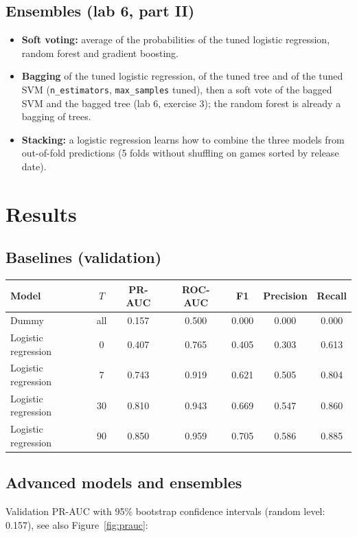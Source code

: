 \documentclass[11pt,a4paper]{article}
\newcommand{\code}[1]{\texttt{#1}}
\begin{document}
\subsection{Ensembles (lab 6, part II)}
\begin{itemize}
  \item \textbf{Soft voting:} average of the probabilities of the tuned logistic regression, random
        forest and gradient boosting.
  \item \textbf{Bagging} of the tuned logistic regression, of the tuned tree and of the tuned SVM
        (\code{n\_estimators}, \code{max\_samples} tuned), then a soft vote of the bagged SVM and the bagged
        tree (lab 6, exercise 3); the random forest is already a bagging of trees.
  \item \textbf{Stacking:} a logistic regression learns how to combine the three models from out-of-fold
        predictions (5 folds without shuffling on games sorted by release date).
\end{itemize}

\section{Results}

\subsection{Baselines (validation)}
\begin{center}
\small
\begin{tabular}{l c c c c c c}
\toprule
Model & $T$ & PR-AUC & ROC-AUC & F1 & Precision & Recall \\
\midrule
Dummy & all & 0.157 & 0.500 & 0.000 & 0.000 & 0.000 \\
Logistic regression & 0  & 0.407 & 0.765 & 0.405 & 0.303 & 0.613 \\
Logistic regression & 7  & 0.743 & 0.919 & 0.621 & 0.505 & 0.804 \\
Logistic regression & 30 & 0.810 & 0.943 & 0.669 & 0.547 & 0.860 \\
Logistic regression & 90 & 0.850 & 0.959 & 0.705 & 0.586 & 0.885 \\
\bottomrule
\end{tabular}
\end{center}

\subsection{Advanced models and ensembles}
Validation PR-AUC with 95\% bootstrap confidence intervals (random level: 0.157), see also Figure~\ref{fig:prauc}:
\end{document}
